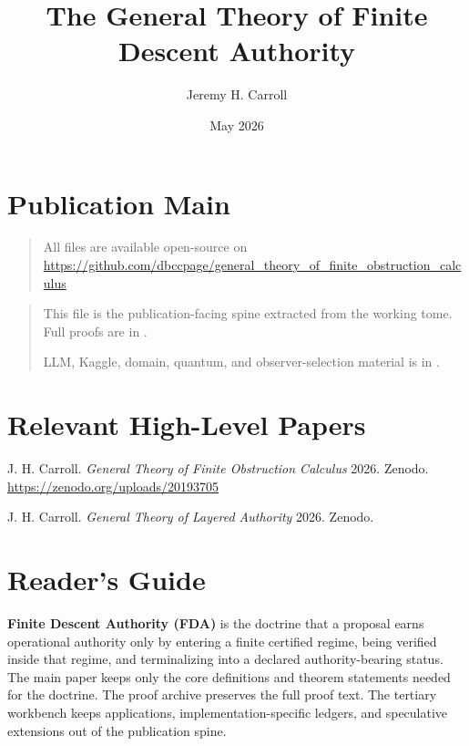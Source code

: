 \documentclass[11pt]{article}
\title{The General Theory of Finite Descent Authority}
\author{Jeremy H. Carroll}
\date{May 2026}
\begin{document}
\maketitle

\section*{Publication Main}

\begin{quote}
All files are available open-source on \url{https://github.com/dbccpage/general_theory_of_finite_obstruction_calculus}
\end{quote}

\begin{quote}
This file is the publication-facing spine extracted from the working tome. Full proofs are in .

LLM, Kaggle, domain, quantum, and observer-selection material is in .
\end{quote}

\section*{Relevant High-Level Papers}

\begin{enumerate}[label={[\arabic*]}]
    \item J. H. Carroll. \textit{General Theory of Finite Obstruction Calculus} 2026. Zenodo. \url{https://zenodo.org/uploads/20193705}
    \item J. H. Carroll. \textit{General Theory of Layered Authority} 2026. Zenodo.
\end{enumerate}

\section*{Reader's Guide}

\textbf{Finite Descent Authority (FDA)} is the doctrine that a proposal earns operational authority only by entering a finite certified regime, being verified inside that regime, and terminalizing into a declared authority-bearing status. The main paper keeps only the core definitions and theorem statements needed for the doctrine. The proof archive preserves the full proof text. The tertiary workbench keeps applications, implementation-specific ledgers, and speculative extensions out of the publication spine.
\end{document}
